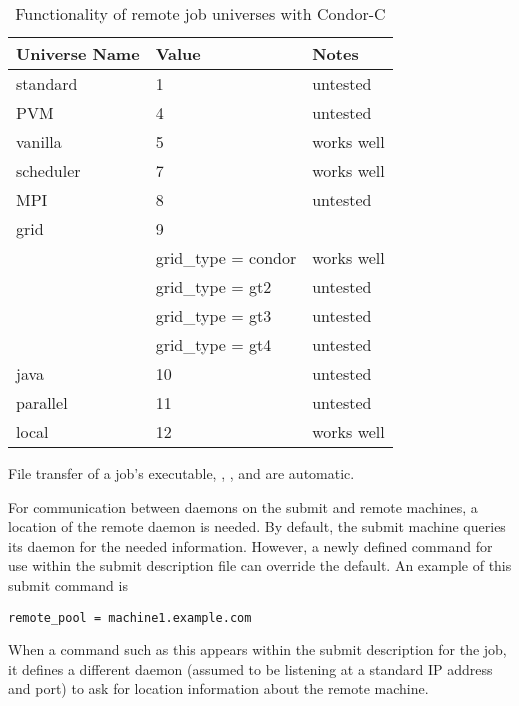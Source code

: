 \begin{center}
\begin{table}[hbt]
\begin{tabular}{|l|l|l}
\textbf{Universe Name} & \textbf{Value} & \textbf{Notes}\\ \hline \hline
standard  & 1 & untested \\ \hline
PVM       & 4 & untested \\ \hline
vanilla   & 5 & works well \\ \hline
scheduler & 7 & works well \\ \hline
MPI       & 8 & untested \\ \hline
grid      & 9 & \\
 & grid\_type = condor & works well \\
 & grid\_type = gt2  & untested \\
 & grid\_type = gt3 & untested \\
 & grid\_type = gt4 & untested \\ \hline
java & 10 & untested \\ \hline
parallel & 11 & untested \\ \hline
local & 12 & works well \\ \hline
\end{tabular}
\caption{\label{working-remote-universes}Functionality of remote job universes with Condor-C}
\end{table}
\end{center}

File transfer of a job's executable, , , and
 are automatic.

For communication between  daemons on the submit
and remote machines,
a location of the remote  daemon is needed.
By default, the submit machine queries its 
daemon for the needed information.
However, a newly defined command for use within the submit
description file can override the default.
An example of this submit command is
\footnotesize
\begin{verbatim}
remote_pool = machine1.example.com
\end{verbatim}
\normalsize
When a command such as this appears within the submit description
for the job,
it defines a different  daemon 
(assumed to be listening at a standard IP address and port)
to ask for location information about the remote machine.

